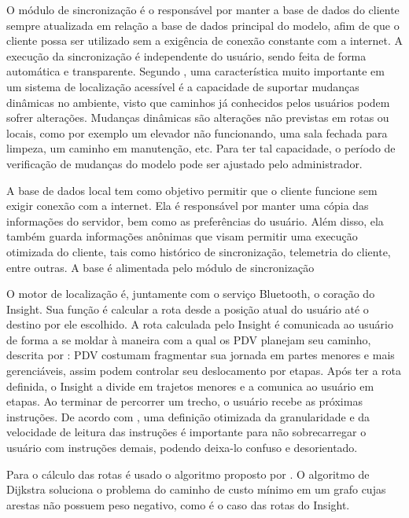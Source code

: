\documentclass[twoside,english,brazilian]{UNISINOSartigo}
\begin{document}
O módulo de sincronização é o responsável por manter a base de dados do cliente sempre atualizada em relação a base de dados principal do modelo, afim de que o cliente possa ser utilizado sem a exigência de conexão constante com a internet. A execução da sincronização é independente do usuário, sendo feita de forma automática e transparente. Segundo , uma característica muito importante em um sistema de localização acessível é a capacidade de suportar mudanças dinâmicas no ambiente, visto que caminhos já conhecidos pelos usuários podem sofrer alterações. Mudanças dinâmicas são alterações não previstas em rotas ou locais, como por exemplo um elevador não funcionando, uma sala fechada para limpeza, um caminho em manutenção, etc. Para ter tal capacidade, o período de verificação de mudanças do modelo pode ser ajustado pelo administrador.

A base de dados local tem como objetivo permitir que o cliente funcione sem exigir conexão com a internet. Ela é responsável por manter uma cópia das informações do servidor, bem como as preferências do usuário. Além disso, ela também guarda informações anônimas que visam permitir uma execução otimizada do cliente, tais como histórico de sincronização, telemetria do cliente, entre outras. A base é alimentada pelo módulo de sincronização

O motor de localização é, juntamente com o serviço Bluetooth, o coração do Insight. Sua função é calcular a rota desde a posição atual do usuário até o destino por ele escolhido. A rota calculada pelo Insight é comunicada ao usuário de forma a se moldar à maneira com a qual os PDV planejam seu caminho, descrita por : PDV costumam fragmentar sua jornada em partes menores e mais gerenciáveis, assim podem controlar seu deslocamento por etapas. Após ter a rota definida, o Insight a divide em trajetos menores e a comunica ao usuário em etapas. Ao terminar de percorrer um trecho, o usuário recebe as próximas instruções. De acordo com , uma definição otimizada da granularidade e da velocidade de leitura das instruções é importante para não sobrecarregar o usuário com instruções demais, podendo deixa-lo confuso e desorientado. 

Para o cálculo das rotas é usado o algoritmo proposto por . O algoritmo de Dijkstra soluciona o problema do caminho de custo mínimo em um grafo cujas arestas não possuem peso negativo, como é o caso das rotas do Insight.
\end{document}
